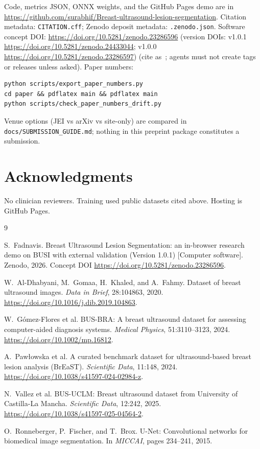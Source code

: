 \documentclass[11pt,a4paper]{article}
\begin{document}
Code, metrics JSON, ONNX weights, and the GitHub Pages demo are in
\url{https://github.com/surabhif/Breast-ultrasound-lesion-segmentation}.
Citation metadata: \texttt{CITATION.cff}; Zenodo deposit metadata: \texttt{.zenodo.json}.
Software concept DOI: \url{https://doi.org/10.5281/zenodo.23286596}
(version DOIs: v1.0.1 \url{https://doi.org/10.5281/zenodo.24433044}; v1.0.0 \url{https://doi.org/10.5281/zenodo.23286597})
(cite as~\cite{fadnavis2026busi}; agents must not create tags or releases unless asked). Paper numbers:
\begin{verbatim}
python scripts/export_paper_numbers.py
cd paper && pdflatex main && pdflatex main
python scripts/check_paper_numbers_drift.py
\end{verbatim}
Venue options (JEI vs arXiv vs site-only) are compared in \texttt{docs/SUBMISSION\_GUIDE.md};
nothing in this preprint package constitutes a submission.

\section*{Acknowledgments}

No clinician reviewers. Training used public datasets cited above. Hosting is GitHub Pages.


\begin{thebibliography}{9}

S.~Fadnavis.
\newblock Breast Ultrasound Lesion Segmentation: an in-browser research demo on BUSI with external validation (Version 1.0.1) [Computer software].
\newblock Zenodo, 2026.
\newblock Concept DOI \url{https://doi.org/10.5281/zenodo.23286596}.

W.~Al-Dhabyani, M.~Gomaa, H.~Khaled, and A.~Fahmy.
\newblock Dataset of breast ultrasound images.
\newblock \emph{Data in Brief}, 28:104863, 2020.
\newblock \url{https://doi.org/10.1016/j.dib.2019.104863}.

W.~G\'omez-Flores et al.
\newblock BUS-BRA: A breast ultrasound dataset for assessing computer-aided diagnosis systems.
\newblock \emph{Medical Physics}, 51:3110--3123, 2024.
\newblock \url{https://doi.org/10.1002/mp.16812}.

A.~Paw{\l}owska et al.
\newblock A curated benchmark dataset for ultrasound-based breast lesion analysis (BrEaST).
\newblock \emph{Scientific Data}, 11:148, 2024.
\newblock \url{https://doi.org/10.1038/s41597-024-02984-z}.

N.~Vallez et al.
\newblock BUS-UCLM: Breast ultrasound dataset from University of Castilla-La Mancha.
\newblock \emph{Scientific Data}, 12:242, 2025.
\newblock \url{https://doi.org/10.1038/s41597-025-04564-2}.

O.~Ronneberger, P.~Fischer, and T.~Brox.
\newblock U-Net: Convolutional networks for biomedical image segmentation.
\newblock In \emph{MICCAI}, pages 234--241, 2015.

\end{thebibliography}
\end{document}
